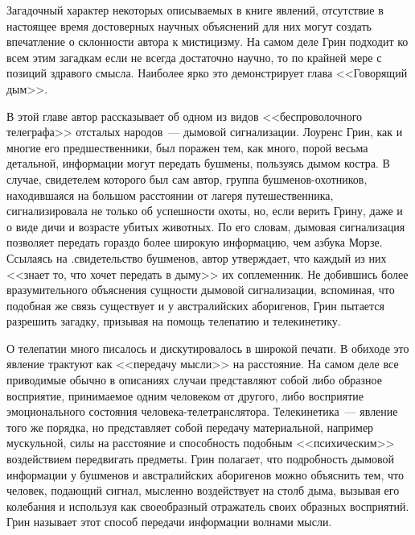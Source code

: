 \documentclass[12pt,a4paper,twoside,openany,svgnames]{memoir}
\begin{document}
Загадочный характер некоторых описываемых в книге явлений, отсутствие в настоящее время достоверных научных объяснений для них могут создать впечатление о склонности автора к мистицизму. На самом деле Грин подходит ко всем этим загадкам если не всегда достаточно научно, то по крайней мере с позиций здравого смысла. Наиболее ярко это демонстрирует 
глава <<Говорящий дым>>.

В этой главе автор рассказывает об одном из видов <<беспроволочного телеграфа>> отсталых народов~--- дымовой сигнализации. Лоуренс Грин, как и многие его предшественники, был поражен тем, как много, порой весьма детальной, информации могут передать бушмены, пользуясь дымом костра. В случае, свидетелем которого был сам автор, группа бушменов-охотников, находившаяся на большом расстоянии от лагеря путешественника, сигнализировала не только об успешности охоты, но, если верить Грину, даже и о виде дичи и возрасте убитых животных. По его словам, дымовая сигнализация позволяет передать гораздо более широкую информацию, чем азбука Морзе. Ссылаясь на .свидетельство бушменов, автор утверждает, что каждый из них <<знает то, что хочет передать в дыму>> их соплеменник. Не добившись более вразумительного объяснения сущности дымовой сигнализации, вспоминая, что подобная же связь существует и у австралийских аборигенов, Грин пытается разрешить загадку, призывая на помощь телепатию и телекинетику.

О телепатии много писалось и дискутировалось в широкой печати. В обиходе это явление трактуют как <<передачу мысли>> на расстояние. На самом деле все приводимые обычно в описаниях случаи представляют собой либо образное восприятие, принимаемое одним человеком от другого, либо восприятие эмоционального состояния человека-телетранслятора. Телекинетика~--- явление того же порядка, но представляет собой передачу материальной, например мускульной, силы на расстояние и способность подобным <<психическим>> воздействием передвигать предметы. Грин полагает, что подробность дымовой информации у бушменов и австралийских аборигенов можно объяснить тем, что человек, подающий сигнал, мысленно воздействует на столб дыма, вызывая его колебания и используя как своеобразный отражатель своих образных восприятий. Грин называет этот способ передачи информации волнами мысли.
\end{document}
